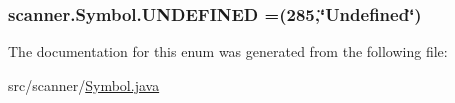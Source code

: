 \subsubsection[{\texorpdfstring{U\+N\+D\+E\+F\+I\+N\+ED}{UNDEFINED}}]{\setlength{\rightskip}{0pt plus 5cm}scanner.\+Symbol.\+U\+N\+D\+E\+F\+I\+N\+ED =(285,\char`\"{}Undefined\char`\"{})}\hypertarget{enumscanner_1_1Symbol_ae8c4e968871042412d500b3278dcfda8}{}\label{enumscanner_1_1Symbol_ae8c4e968871042412d500b3278dcfda8}


The documentation for this enum was generated from the following file\+:\begin{DoxyCompactItemize}
\item 
src/scanner/\hyperlink{Symbol_8java}{Symbol.\+java}\end{DoxyCompactItemize}
